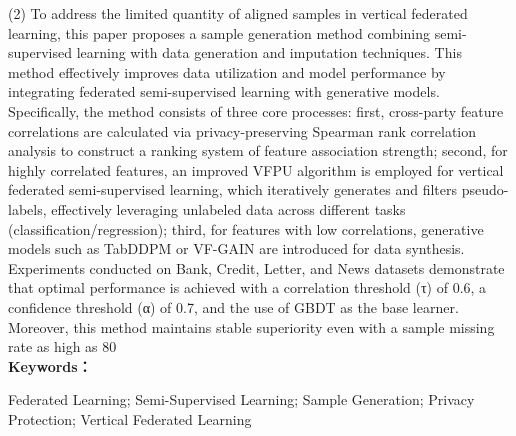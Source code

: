 (2) To address the limited quantity of aligned samples in vertical federated learning, this paper proposes a sample generation method combining semi-supervised learning with data generation and imputation techniques. This method effectively improves data utilization and model performance by integrating federated semi-supervised learning with generative models. Specifically, the method consists of three core processes: first, cross-party feature correlations are calculated via privacy-preserving Spearman rank correlation analysis to construct a ranking system of feature association strength; second, for highly correlated features, an improved VFPU algorithm is employed for vertical federated semi-supervised learning, which iteratively generates and filters pseudo-labels, effectively leveraging unlabeled data across different tasks (classification/regression); third, for features with low correlations, generative models such as TabDDPM or VF-GAIN are introduced for data synthesis. Experiments conducted on Bank, Credit, Letter, and News datasets demonstrate that optimal performance is achieved with a correlation threshold (τ) of 0.6, a confidence threshold (α) of 0.7, and the use of GBDT as the base learner. Moreover, this method maintains stable superiority even with a sample missing rate as high as 80\	%
\\


\noindent\textbf{Keywords：} 
\begin{minipage}[t]{0.85\linewidth}
	Federated Learning; Semi-Supervised Learning; Sample Generation; Privacy Protection; Vertical Federated Learning
\end{minipage}

\clearpage